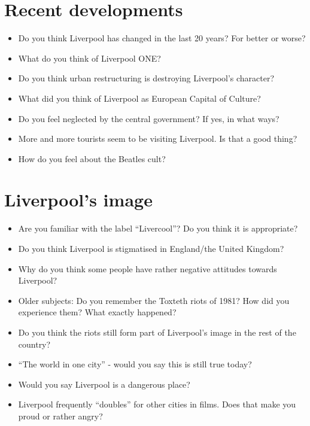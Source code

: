 	\section*{Recent developments}
	\begin{multicols}{2}
		\begin{itemize}
			\item Do you think Liverpool has changed in the last 20 years? For better or worse?
			\item What do you think of Liverpool ONE?
			\item Do you think urban restructuring is destroying Liverpool's character?
			\item What did you think of Liverpool as European Capital of Culture?
			\item Do you feel neglected by the central government? If yes, in what ways?
			\item More and more tourists seem to be visiting Liverpool. Is that a good thing?
			\item How do you feel about the Beatles cult?
		\end{itemize}
	\end{multicols}
	
	\section*{Liverpool's image}
	\begin{multicols}{2}
		\begin{itemize}
			\item Are you familiar with the label ``Livercool''? Do you think it is appropriate?
			\item Do you think Liverpool is stigmatised in England/the United Kingdom?
			\item Why do you think some people have rather negative attitudes towards Liverpool?
			\item Older subjects: Do you remember the Toxteth riots of 1981? How did you experience them? What exactly happened?
			\item Do you think the riots still form part of Liverpool's image in the rest of the country?
			\item ``The world in one city'' - would you say this is still true today?
			\item Would you say Liverpool is a dangerous place?
			\item Liverpool frequently ``doubles'' for other cities in films. Does that make you proud or rather angry?
		\end{itemize}
	\end{multicols}
	

